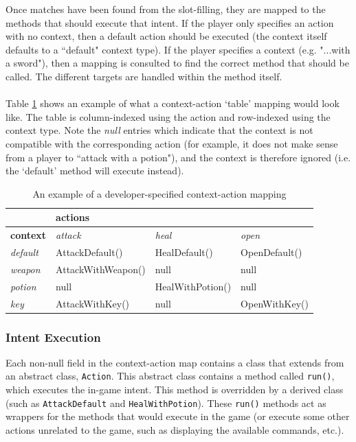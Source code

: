 \documentclass[11pt]{article}
\begin{document}
Once matches have been found from the slot-filling, they are mapped to the methods that should execute that intent. If the player only specifies an action with no context, then a default action should be executed (the context itself defaults to a ``default" context type). If the player specifies a context (e.g. "...with a sword"), then a mapping is consulted to find the correct method that should be called. The different targets are handled within the method itself.
\\
\\
Table \ref{action-context-ex-table} shows an example of what a context-action `table' mapping would look like. The table is column-indexed using the action and row-indexed using the context  type. Note the \textit{null} entries which indicate that the context is not compatible with the corresponding action (for example, it does not make sense from a player to ``attack with a potion"), and the context is therefore ignored (i.e. the `default' method will execute instead).

\begin{table}[H]
\centering
\caption{An example of a developer-specified context-action mapping}
\label{action-context-ex-table}
\begin{tabular}{l|l|l|l|}
\cline{2-4}
\multicolumn{1}{c|}{\textbf{}}         & \multicolumn{3}{l|}{\textbf{actions}}                  \\ \hline
\multicolumn{1}{|l|}{\textbf{context}} & \textit{attack}    & \textit{heal}  & \textit{open}    \\ \hline
\multicolumn{1}{|l|}{\textit{default}} & AttackDefault()    & HealDefault()  & OpenDefault()    \\ \hline
\multicolumn{1}{|l|}{\textit{weapon}}  & AttackWithWeapon() & null           & null \\ \hline
\multicolumn{1}{|l|}{\textit{potion}}  & null               & HealWithPotion() & null             \\ \hline
\multicolumn{1}{|l|}{\textit{key}}     & AttackWithKey()    & null           & OpenWithKey()   \\ \hline
\end{tabular}
\end{table}

\subsubsection{Intent Execution}

Each non-null field in the context-action map contains a class that extends from an abstract class, \texttt{Action}. This abstract class contains a method called \texttt{run()}, which executes the in-game intent. This method is overridden by a derived class (such as \texttt{AttackDefault} and \texttt{HealWithPotion}). These \texttt{run()} methods act as wrappers for the methods that would execute in the game (or execute some other actions unrelated to the game, such as displaying the available commands, etc.).
\end{document}
